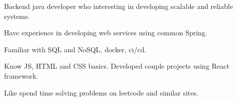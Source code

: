 \documentclass[]{cv-style}
\begin{document}
    \hspace*{0.7cm} Backend java developer who interesting in developing scalable and reliable systems.
    {\par}
    \hspace*{0.7cm} Have experience in developing web services using common Spring.
    {\par}
    \hspace*{0.7cm} Familiar with SQL and NoSQL, docker, ci/cd.
    {\par}
    \hspace*{0.7cm} Know JS, HTML and CSS basics.
    Developed couple projects using React framework.
    {\par}
    \hspace*{0.7cm} Like spend time solving problems on leetcode and similar sites.

    \vspace{0.3cm}

    \footer
\end{document}
